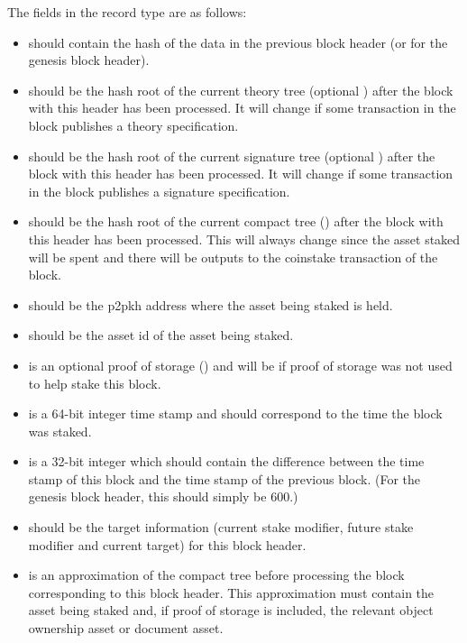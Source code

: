 The fields in the record type {} are as follows:
\begin{itemize}
\item {} should contain the hash of the data in the previous block header (or {} for the genesis block header).
\item {} should be the hash root of the current theory tree (optional {}) after the block with this header has been processed.
It will change if some transaction in the block publishes a theory specification.
\item {} should be the hash root of the current signature tree (optional {}) after the block with this header has been processed.
It will change if some transaction in the block publishes a signature specification.
\item {} should be the hash root of the current compact tree ({})
after the block with this header has been processed.
This will always change since the asset staked will be spent and there will be
outputs to the coinstake transaction of the block.
\item {} should be the p2pkh address where the asset being staked is held.
\item {} should be the asset id of the asset being staked.
\item {} is an optional proof of storage ({})
and will be {} if proof of storage was not used to help stake this block.
\item {} is a 64-bit integer time stamp and should correspond to the time the block was staked.
\item {} is a 32-bit integer which should contain the difference between the time stamp of this block and the time stamp of the previous block. (For the genesis block header, this should simply be $600$.)
\item {} should be the target information (current stake modifier, future stake modifier and current target) for this block header.
\item {} is an approximation of the compact tree before processing the block corresponding to this block header.
This approximation must contain the asset being staked and, if proof of storage is included,
the relevant object ownership asset
or document asset.
\end{itemize}

